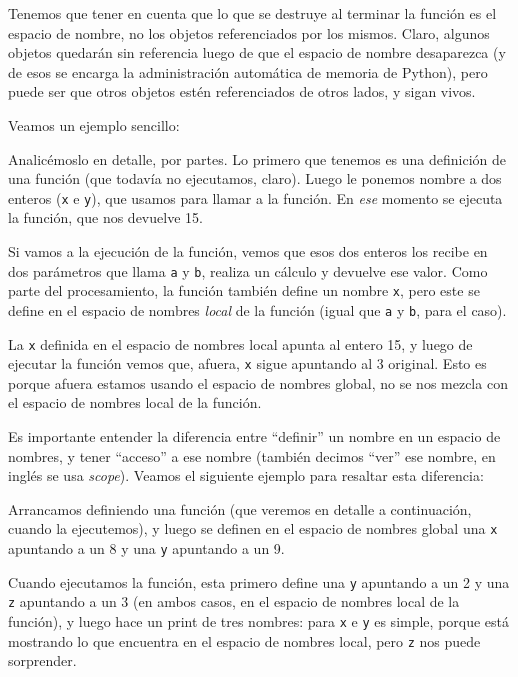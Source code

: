Tenemos que tener en cuenta que lo que se destruye al terminar la función es el espacio de nombre, no los objetos referenciados por los mismos. Claro, algunos objetos quedarán sin referencia luego de que el espacio de nombre desaparezca (y de esos se encarga la administración automática de memoria de Python), pero puede ser que otros objetos estén referenciados de otros lados, y sigan vivos.

Veamos un ejemplo sencillo:


Analicémoslo en detalle, por partes. Lo primero que tenemos es una definición de una función (que todavía no ejecutamos, claro). Luego le ponemos nombre a dos enteros (\verb|x| e \verb|y|), que usamos para llamar a la función. En \textit{ese} momento se ejecuta la función, que nos devuelve 15.

Si vamos a la ejecución de la función, vemos que esos dos enteros los recibe en dos parámetros que llama \verb|a| y \verb|b|, realiza un cálculo y devuelve ese valor. Como parte del procesamiento, la función también define un nombre \verb|x|, pero este se define en el espacio de nombres \textit{local} de la función (igual que \verb|a| y \verb|b|, para el caso).

La \verb|x| definida en el espacio de nombres local apunta al entero 15, y luego de ejecutar la función vemos que, afuera, \verb|x| sigue apuntando al 3 original. Esto es porque afuera estamos usando el espacio de nombres global, no se nos mezcla con el espacio de nombres local de la función.

Es importante entender la diferencia entre ``definir'' un nombre en un espacio de nombres, y tener ``acceso'' a ese nombre (también decimos ``ver'' ese nombre, en inglés se usa \textit{scope}). Veamos el siguiente ejemplo para resaltar esta diferencia:


Arrancamos definiendo una función (que veremos en detalle a continuación, cuando la ejecutemos), y luego se definen en el espacio de nombres global una \verb|x| apuntando a un 8 y una \verb|y| apuntando a un 9.

Cuando ejecutamos la función, esta primero define una \verb|y| apuntando a un 2 y una \verb|z| apuntando a un 3 (en ambos casos, en el espacio de nombres local de la función), y luego hace un print de tres nombres: para \verb|x| e \verb|y| es simple, porque está mostrando lo que encuentra en el espacio de nombres local, pero \verb|z| nos puede sorprender. 

